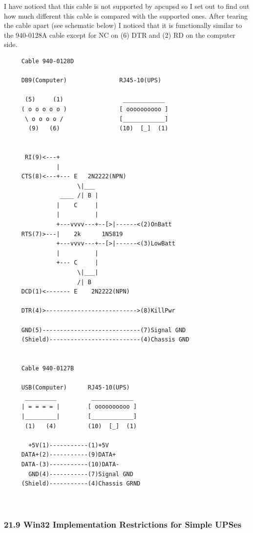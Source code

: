 I have noticed that this cable is not supported by apcupsd so I set out to
find out how much different this cable is compared with the supported ones.
After tearing the cable apart (see schematic below) I noticed that it is
functionally similar to the 940-0128A cable except for NC on (6) DTR and (2)
RD on the computer side. 

\footnotesize
\begin{verbatim}
     Cable 940-0128D
     
     DB9(Computer)               RJ45-10(UPS)
     
      (5)     (1)                 ____________
     ( o o o o o )               [ oooooooooo ]
      \ o o o o /                [____________]
       (9)   (6)                 (10)  [_]  (1)
     
     
      RI(9)<---+
               |
     CTS(8)<---+--- E   2N2222(NPN)
                     \|___
                ____ /| B |
               |    C     |
               |          |
               +---vvvv---+--[>|------<(2)OnBatt
     RTS(7)>---|    2k      1N5819
               +---vvvv---+--[>|------<(3)LowBatt
               |          |
               +--- C     |
                     \|___|
                     /| B
     DCD(1)<------- E    2N2222(NPN)
     
     DTR(4)>-------------------------->(8)KillPwr
     
     GND(5)----------------------------(7)Signal GND
     (Shield)--------------------------(4)Chassis GND
     
     
     Cable 940-0127B
     
     USB(Computer)      RJ45-10(UPS)
      _________          ____________
     | = = = = |        [ oooooooooo ]
     |_________|        [____________]
      (1)   (4)         (10)  [_]  (1)
     
       +5V(1)-----------(1)+5V
     DATA+(2)-----------(9)DATA+
     DATA-(3)-----------(10)DATA-
       GND(4)-----------(7)Signal GND
     (Shield)-----------(4)Chassis GRND
     
     
\end{verbatim}
\normalsize

\label{Win32-Implementation-Restrictions-for-Simple-UPSes}

\subsubsection*{21.9 Win32 Implementation Restrictions for Simple UPSes}

